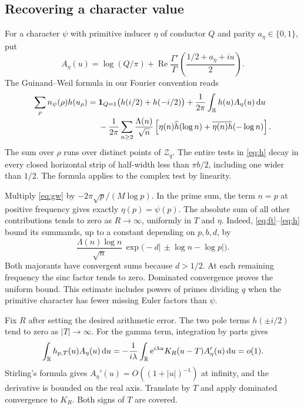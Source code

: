 \documentclass[11pt,letterpaper]{article}
\newcommand{\re}{\operatorname{Re}}\newcommand{\e}{\mathrm e}\newcommand{\dd}{\,\mathrm d}
\newcommand{\wt}{\widehat}\newcommand{\one}{\mathbf 1}
\begin{document}
\subsection*{Recovering a character value}
For a character $\psi$ with primitive inducer $\eta$ of conductor $Q$ and parity $a_\eta\in\{0,1\}$, put
\[
 A_\eta(u)=\log(Q/\pi)+\re\frac{\Gamma'}{\Gamma}
                \left(\frac{1/2+a_\eta+iu}{2}\right).
\]
The Guinand--Weil formula in our Fourier convention reads \cite[(2.1), (2.6)]{gw}
\begin{align}
 \sum_\rho n_\psi(\rho) h(u_\rho)
   ={}&\one_{Q=1}\bigl(h(i/2)+h(-i/2)\bigr)
       +\frac1{2\pi}\int_{\R}h(u)A_\eta(u)\dd u\notag\\[-2pt]
   &-\frac1{2\pi}\sum_{n\ge2}\frac{\Lambda(n)}{\sqrt n}
       \left[\eta(n)\wt h(\log n)+\overline{\eta(n)}\wt h(-\log n)\right].
 \label{eq:gw}
\end{align}
The sum over $\rho$ runs over distinct points of $\mathcal Z_q$. The entire tests in \eqref{eq:h} decay in every closed horizontal strip of half-width less than $\pi b/2$, including one wider than $1/2$. The formula applies to the complex test by linearity.

Multiply \eqref{eq:gw} by $-2\pi\sqrt p/(M\log p)$. In the prime sum, the term $n=p$ at positive frequency gives exactly $\eta(p)=\psi(p)$. The absolute sum of all other contributions tends to zero as $R\to\infty$, uniformly in $T$ and $\eta$. Indeed, \eqref{eq:ft}--\eqref{eq:h} bound its summands, up to a constant depending on $p,b,d$, by
\[
 \frac{\Lambda(n)\log n}{\sqrt n}\,
       \exp\!\big(-d|\,{\pm}\log n-\log p|\big).
\]
Both majorants have convergent sums because $d>1/2$. At each remaining frequency the sinc factor tends to zero. Dominated convergence proves the uniform bound. This estimate includes powers of primes dividing $q$ when the primitive character has fewer missing Euler factors than $\psi$.

Fix $R$ after setting the desired arithmetic error. The two pole terms $h(\pm i/2)$ tend to zero as $|T|\to\infty$. For the gamma term, integration by parts gives
\[
 \int_{\R} h_{p,T}(u)A_\eta(u)\dd u
  =-\frac1{i\lambda}\int_{\R} \e^{i\lambda u} K_R(u-T) A_\eta'(u)\dd u=o(1).
\]
Stirling's formula gives $A_\eta'(u)=O((1+|u|)^{-1})$ at infinity, and the derivative is bounded on the real axis. Translate by $T$ and apply dominated convergence to $K_R$. Both signs of $T$ are covered.
\end{document}
